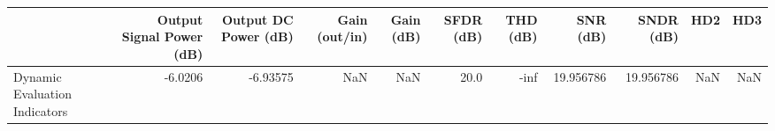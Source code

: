\begin{tabular}{lrrrrrrrrrr}
\toprule
{} &  Output Signal Power (dB) &  Output DC Power (dB) &  Gain (out/in) &  Gain (dB) &  SFDR (dB) &  THD (dB) &   SNR (dB) &  SNDR (dB) &  HD2 &  HD3 \\
\midrule
Dynamic Evaluation Indicators &                   -6.0206 &              -6.93575 &            NaN &        NaN &       20.0 &      -inf &  19.956786 &  19.956786 &  NaN &  NaN \\
\bottomrule
\end{tabular}
